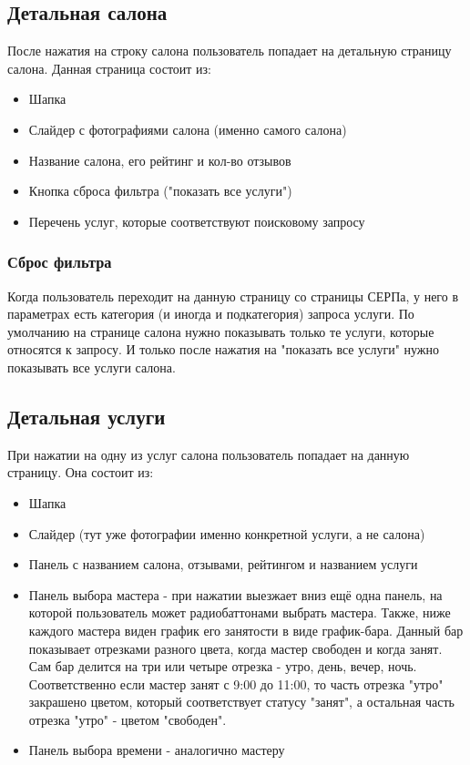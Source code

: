 \documentclass[DIV=calc, paper=a4, fontsize=11pt]{scrartcl} %
\begin{document}
\subsection{Детальная салона}
После нажатия на строку салона пользователь попадает на детальную страницу салона. Данная страница состоит из:

\begin{itemize}
	\item Шапка
	\item Слайдер с фотографиями салона (именно самого салона)
	\item Название салона, его рейтинг и кол-во отзывов
	\item Кнопка сброса фильтра ("показать все услуги")
	\item Перечень услуг, которые соответствуют поисковому запросу 
\end{itemize}

\subsubsection{Сброс фильтра}
Когда пользователь переходит на данную страницу со страницы СЕРПа, у него в параметрах есть категория (и иногда и подкатегория) запроса услуги. По умолчанию на странице салона нужно показывать только те услуги, которые относятся к запросу. И только после нажатия на "показать все услуги" нужно показывать все услуги салона.

\subsection{Детальная услуги}
При нажатии на одну из услуг салона пользователь попадает на данную страницу. Она состоит из:

\begin{itemize}
	\item Шапка
	\item Слайдер (тут уже фотографии именно конкретной услуги, а не салона)
	\item Панель с названием салона, отзывами, рейтингом и названием услуги
	\item Панель выбора мастера - при нажатии выезжает вниз ещё одна панель, на которой пользователь может радиобаттонами выбрать мастера. Также, ниже каждого мастера виден график его занятости в виде график-бара. Данный бар показывает отрезками разного цвета, когда мастер свободен и когда занят. Сам бар делится на три или четыре отрезка - утро, день, вечер, ночь. Соответственно если мастер занят с 9:00 до 11:00, то часть отрезка "утро" закрашено цветом, который соответствует статусу "занят", а остальная часть отрезка "утро" - цветом "свободен".
	\item Панель выбора времени - аналогично мастеру
\end{itemize}
\end{document}
